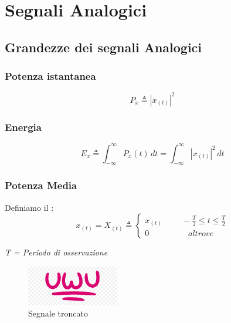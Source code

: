 \section{Segnali Analogici}
    \subsection{Grandezze dei segnali Analogici}
    
        \subsubsection{Potenza istantanea}
            \[
                P_{x} \triangleq |x_{(t)}|^2   
            \]
        \subsubsection{Energia}
            \[
                E_{x} \triangleq \int_{-\infty}^{\infty} P_{x}(t) \,dt = \int_{-\infty}^{\infty} |x_{(t)}|^2 \,dt    
            \]
        \subsubsection{Potenza Media}
            Definiamo il :
                \[
                    x_{(t)} = X_{(t)} \triangleq 
                    \begin{cases}
                        x_{(t)} \hspace{1cm} -\frac{T}{2} \leq t \leq \frac{T}{2} \\
                        0 \hspace{2cm}altrove
                    \end{cases}
                    \]  
                    \begin{center}
                        \em T = Periodo di osservazione
                    \end{center}
                \begin{figure}[h]
                    \centering
                    \includegraphics[width=4cm]{media/uwu.png}
                    \caption{Segnale troncato}
                    \label{fig:troncato}
                \end{figure}
            

